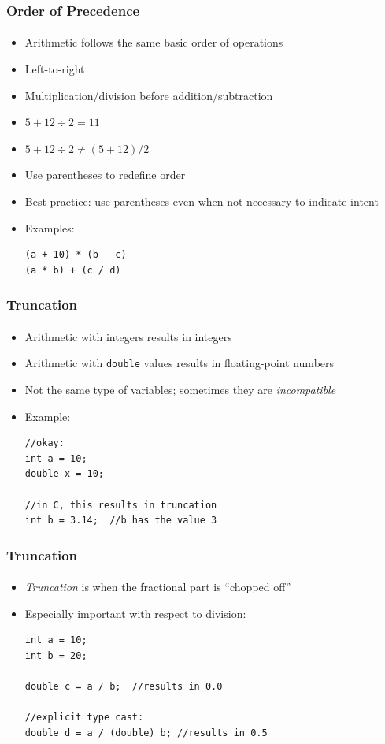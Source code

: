 \documentclass[]{beamer}
\begin{document}
\begin{frame}[fragile]
    \frametitle{Order of Precedence}
    \framesubtitle{}
    
\begin{itemize}[<+->]
  \item Arithmetic follows the same basic order of operations
  \item Left-to-right
  \item Multiplication/division before addition/subtraction
  \item $5 + 12 \div 2 = 11$
  \item $5 + 12 \div 2 \neq (5 + 12) / 2$
  \item Use parentheses to redefine order
  \item Best practice: use parentheses even when not necessary to indicate intent
  \item Examples:
\begin{verbatim}
(a + 10) * (b - c)
(a * b) + (c / d)
\end{verbatim}
\end{itemize}

\end{frame}


\begin{frame}[fragile]
    \frametitle{Truncation}
    \framesubtitle{}
    
\begin{itemize}[<+->]
  \item Arithmetic with integers results in integers
  \item Arithmetic with \texttt{double} values results in floating-point numbers
  \item Not the same type of variables; sometimes they are \emph{incompatible}
  \item Example:
\begin{verbatim}
//okay:
int a = 10;
double x = 10;

//in C, this results in truncation
int b = 3.14;  //b has the value 3
\end{verbatim}
\end{itemize}
\end{frame}


\begin{frame}[fragile]
    \frametitle{Truncation}
    \framesubtitle{}  
    
\begin{itemize}[<+->]
  \item \emph{Truncation} is when the fractional part is ``chopped off''
  \item Especially important with respect to division:
\begin{verbatim}
int a = 10;
int b = 20;

double c = a / b;  //results in 0.0

//explicit type cast:
double d = a / (double) b; //results in 0.5
\end{verbatim}

\end{itemize}

\end{frame}
\end{document}

